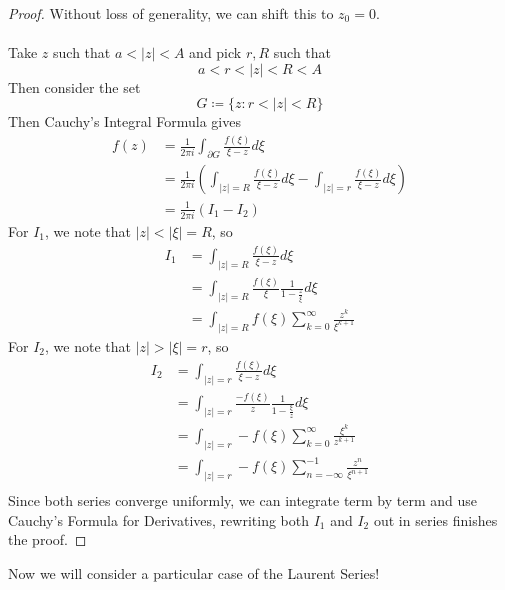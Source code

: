 \begin{proof}
Without loss of generality, we can shift this to $z_0 = 0$.\\\\
Take $z$ such that $a < |z| < A$ and pick $r, R$ such that
\[a < r < |z| < R < A\]
Then consider the set
\[G \coloneqq \{z: r < |z| < R \}\]
Then Cauchy's Integral Formula gives
\begin{align*}
    f(z) &= \frac{1}{2\pi i} \int_{\partial G} \frac{f(\xi)}{\xi - z} d\xi\\
    &= \frac{1}{2\pi i} (\int_{|z| = R} \frac{f(\xi)}{\xi - z} d\xi - \int_{|z| = r} \frac{f(\xi)}{\xi - z} d\xi)\\
    &= \frac{1}{2\pi i} (I_1 - I_2)
\end{align*}
For $I_1$, we note that $|z| < |\xi| = R$, so
\begin{align*}
    I_1 &= \int_{|z| = R} \frac{f(\xi)}{\xi - z} d\xi\\
    &= \int_{|z| = R} \frac{f(\xi)}{\xi} \frac{1}{1 - \frac{z}{\xi}} d\xi\\
    &= \int_{|z| = R} f(\xi) \sum_{k = 0}^\infty \frac{z^k}{\xi^{k+1}}
\end{align*}
For $I_2$, we note that $|z| > |\xi| = r$, so
\begin{align*}
    I_2 &= \int_{|z| = r} \frac{f(\xi)}{\xi - z} d\xi\\
    &= \int_{|z| = r} \frac{-f(\xi)}{z} \frac{1}{1 - \frac{\xi}{z}} d\xi\\
    &= \int_{|z| = r} -f(\xi) \sum_{k = 0}^\infty \frac{\xi^k}{z^{k+1}}\\
    &= \int_{|z| = r} -f(\xi) \sum_{n = -\infty}^{-1} \frac{z^n}{\xi^{n+1}}\\ \tag*{Change of Variables}
\end{align*}
Since both series converge uniformly, we can integrate term by term and use Cauchy's Formula for Derivatives, rewriting both $I_1$ and $I_2$ out in series finishes the proof.
\end{proof}

Now we will consider a particular case of the Laurent Series!

